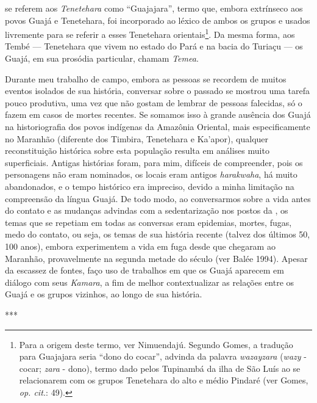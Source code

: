 se referem aos \emph{Tenetehara} como ``Guajajara'', termo que, embora
extrínseco aos povos Guajá e Tenetehara, foi incorporado ao léxico de
ambos os grupos e usados livremente para se referir a esses Tenetehara
orientais\footnote{Para a origem deste termo, ver Nimuendajú. Segundo
  Gomes, a tradução para Guajajara seria ``dono do cocar'', advinda da
  palavra \emph{wazayzara} (\emph{wazy} - cocar; \emph{zara} - dono),
  termo dado pelos Tupinambá da ilha de São Luís ao se relacionarem com
  os grupos Tenetehara do alto e médio Pindaré (ver Gomes, \emph{op. cit.}:
  49).}. Da mesma forma, aos Tembé --- Tenetehara que vivem no estado do
Pará e na bacia do Turiaçu --- os Guajá, em sua prosódia particular,
chamam \emph{Temea}.

Durante meu trabalho de campo, embora as pessoas se recordem de muitos
eventos isolados de sua história, conversar sobre o passado se mostrou
uma tarefa pouco produtiva, uma vez que não gostam de lembrar de pessoas
falecidas, só o fazem em casos de mortes recentes. Se somamos isso à
grande ausência dos Guajá na historiografia dos povos indígenas da
Amazônia Oriental, mais especificamente no Maranhão (diferente dos
Timbira, Tenetehara e Ka'apor), qualquer reconstituição histórica sobre
esta população resulta em análises muito superficiais. Antigas histórias
foram, para mim, difíceis de compreender, pois os personagens não eram
nominados, os locais eram antigos \emph{harakwaha}, há muito
abandonados, e o tempo histórico era impreciso, devido a minha limitação
na compreensão da língua Guajá. De todo modo, ao conversarmos sobre a
vida antes do contato e as mudanças advindas com a sedentarização nos
postos da , os temas que se repetiam em todas as conversas eram
epidemias, mortes, fugas, medo do contato, ou seja, os temas de sua
história recente (talvez dos últimos 50, 100 anos), embora experimentem
a vida em fuga desde que chegaram ao Maranhão, provavelmente na segunda
metade do século  (ver Balée 1994). Apesar da escassez de fontes,
faço uso de trabalhos em que os Guajá aparecem em diálogo com seus
\emph{Kamara}, a fim de melhor contextualizar as relações entre os Guajá
e os grupos vizinhos, ao longo de sua história.

\begin{center}
***
\end{center}

